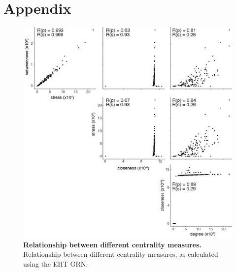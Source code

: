 
\chapter{\label{appendix}Appendix}

\minitoc


\begin{figure}[p]
    \centering
    \includegraphics[width=\textwidth,height=\textheight,keepaspectratio]{figures/appendix/app_centrality-comparison.png}
    \caption[{Relationship between different centrality measures.}]
    {\textbf{Relationship between different centrality measures.} 
    Relationship between different centrality measures, as calculated using the EHT GRN.
    }
    \label{fig:app_centrality-comparison}
\end{figure}
\clearpage


